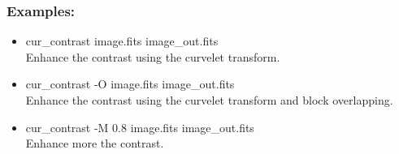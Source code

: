 \subsubsection*{Examples:}
\begin{itemize}
\baselineskip=0.4truecm
\itemsep=0.1truecm
\item cur\_contrast image.fits image\_out.fits\\
Enhance the contrast using the curvelet transform.
\item cur\_contrast -O image.fits image\_out.fits\\
Enhance the contrast using the curvelet transform and block overlapping.
\item cur\_contrast -M 0.8 image.fits image\_out.fits\\
Enhance more the contrast.
\end{itemize}

